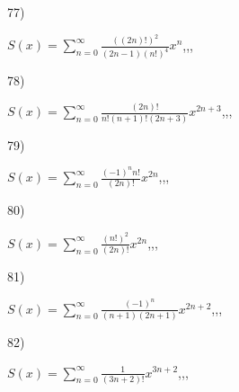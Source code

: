\documentclass[11pt, ukrainian]{article}
\begin{document}
\par
\vspace{0.9cm}
77) \space 
{%
{$S(x)=\sum\limits_{n=0}^{\infty}{\frac{((2n)!)^2}{(2n-1)(n!)^4}}{x^{{n}}}$},,, \par \smallskip  
}
\par
\vspace{0.9cm}
78) \space 
{%
{$S(x)=\sum\limits_{n=0}^{\infty}{\frac{(2n)!}{n!(n+1)!(2n+3)}}{x^{{2n+3}}}$},,, \par \smallskip  
}
\par
\vspace{0.9cm}
79) \space 
{%
{$S(x)=\sum\limits_{n=0}^{\infty}{\frac{{(-1)^n}{n!}}{(2n)!}}{x^{{2n}}}$},,, \par \smallskip  
}
\par
\vspace{0.9cm}
80) \space 
{%
{$S(x)=\sum\limits_{n=0}^{\infty}{\frac{(n!)^2}{(2n)!}}{x^{{2n}}}$},,, \par \smallskip  
}
\par
\newpage
81) \space 
{%
{$S(x)=\sum\limits_{n=0}^{\infty}{\frac{(-1)^n}{(n+1)(2n+1)}}{x^{{2n+2}}}$},,, \par \smallskip  
}
\par
\vspace{0.9cm}
82) \space 
{%
{$S(x)=\sum\limits_{n=0}^{\infty}{\frac{1}{(3n+2)!}}{x^{{3n+2}}}$},,, \par \smallskip  
}
\end{document}
